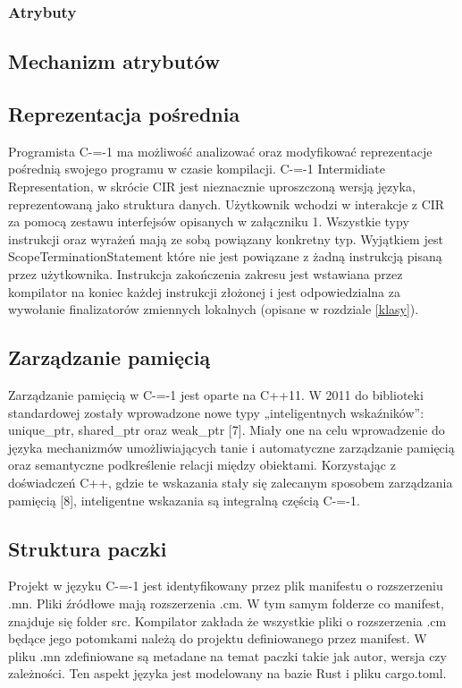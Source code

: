 \subsubsection{Atrybuty}
\subsection{Mechanizm atrybutów}
\subsection{Reprezentacja pośrednia}\label{reprezentacja_posrednia}
Programista C-=-1 ma możliwość analizować oraz modyfikować reprezentacje pośrednią swojego programu w czasie kompilacji. C-=-1 Intermidiate Representation, w skrócie CIR jest nieznacznie uproszczoną wersją języka, reprezentowaną jako struktura danych.
Użytkownik wchodzi w interakcje z CIR za pomocą zestawu interfejsów opisanych w załączniku 1. Wszystkie typy instrukcji oraz wyrażeń mają ze sobą powiązany konkretny typ. Wyjątkiem jest ScopeTerminationStatement które nie jest powiązane z żadną instrukcją pisaną przez użytkownika. Instrukcja zakończenia zakresu jest wstawiana przez kompilator na koniec każdej instrukcji złożonej i jest odpowiedzialna za wywołanie finalizatorów zmiennych lokalnych (opisane w rozdziale \ref{klasy}).
\subsection{Zarządzanie pamięcią}
Zarządzanie pamięcią w C-=-1 jest oparte na C++11. W 2011 do biblioteki standardowej zostały wprowadzone nowe typy „inteligentnych wskaźników”: unique\_ptr, shared\_ptr oraz weak\_ptr [7]. Miały one na celu wprowadzenie do języka mechanizmów umożliwiających tanie i automatyczne zarządzanie pamięcią oraz semantyczne podkreślenie relacji między obiektami.
Korzystając z doświadczeń C++, gdzie te wskazania stały się zalecanym sposobem zarządzania pamięcią [8], inteligentne wskazania są integralną częścią C-=-1.
\subsection{Struktura paczki}\label{struktura_paczki}
Projekt w języku C-=-1 jest identyfikowany przez plik manifestu o rozszerzeniu .mn. Pliki źródłowe mają rozszerzenia .cm. W tym samym folderze co manifest, znajduje się folder src. Kompilator zakłada że wszystkie pliki o rozszerzenia .cm będące jego potomkami należą do projektu definiowanego przez manifest.
W pliku .mn zdefiniowane są metadane na temat paczki takie jak autor, wersja czy zależności. Ten aspekt języka jest modelowany na bazie Rust i pliku cargo.toml.
